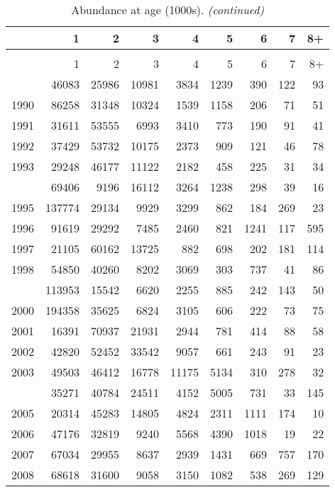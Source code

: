 \documentclass[
]{article}
\begin{document}
\begin{longtable}[t]{lrrrrrrrr}
\caption{\label{tab:NAA-table}Abundance at age (1000s).}\\
\toprule
  & 1 & 2 & 3 & 4 & 5 & 6 & 7 & 8+\\
\midrule
\endfirsthead
\caption[]{Abundance at age (1000s). \textit{(continued)}}\\
\toprule
  & 1 & 2 & 3 & 4 & 5 & 6 & 7 & 8+\\
\midrule
\endhead

\endfoot
\bottomrule
\endlastfoot
1989 & 46083 & 25986 & 10981 & 3834 & 1239 & 390 & 122 & 93\\
1990 & 86258 & 31348 & 10324 & 1539 & 1158 & 206 & 71 & 51\\
1991 & 31611 & 53555 & 6993 & 3410 & 773 & 190 & 91 & 41\\
1992 & 37429 & 53732 & 10175 & 2373 & 909 & 121 & 46 & 78\\
1993 & 29248 & 46177 & 11122 & 2182 & 458 & 225 & 31 & 34\\
\addlinespace
1994 & 69406 & 9196 & 16112 & 3264 & 1238 & 298 & 39 & 16\\
1995 & 137774 & 29134 & 9929 & 3299 & 862 & 184 & 269 & 23\\
1996 & 91619 & 29292 & 7485 & 2460 & 821 & 1241 & 117 & 595\\
1997 & 21105 & 60162 & 13725 & 882 & 698 & 202 & 181 & 114\\
1998 & 54850 & 40260 & 8202 & 3069 & 303 & 737 & 41 & 86\\
\addlinespace
1999 & 113953 & 15542 & 6620 & 2255 & 885 & 242 & 143 & 50\\
2000 & 194358 & 35625 & 6824 & 3105 & 606 & 222 & 73 & 75\\
2001 & 16391 & 70937 & 21931 & 2944 & 781 & 414 & 88 & 58\\
2002 & 42820 & 52452 & 33542 & 9057 & 661 & 243 & 91 & 23\\
2003 & 49503 & 46412 & 16778 & 11175 & 5134 & 310 & 278 & 32\\
\addlinespace
2004 & 35271 & 40784 & 24511 & 4152 & 5005 & 731 & 33 & 145\\
2005 & 20314 & 45283 & 14805 & 4824 & 2311 & 1111 & 174 & 10\\
2006 & 47176 & 32819 & 9240 & 5568 & 4390 & 1018 & 19 & 22\\
2007 & 67034 & 29955 & 8637 & 2939 & 1431 & 669 & 757 & 170\\
2008 & 68618 & 31600 & 9058 & 3150 & 1082 & 538 & 269 & 129\\

\end{longtable}
\end{document}
